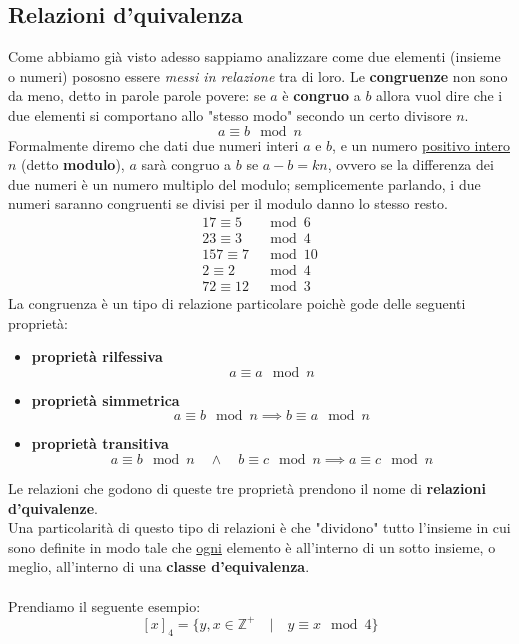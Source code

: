 \subsection{Relazioni d'quivalenza}
Come abbiamo già visto adesso sappiamo analizzare come due elementi
(insieme o numeri) pososno essere \emph{messi in relazione} tra di loro.
Le \textbf{congruenze} non sono da meno, detto in parole parole povere: 
se \(a\) è \textbf{congruo} a \(b\) allora vuol dire che i due elementi 
si comportano allo "stesso modo" secondo un certo divisore \(n\).
\[ a \equiv b \mod n\]
Formalmente diremo che dati due numeri interi \(a\) e \(b\), e un numero
\underline{positivo intero} \(n\) (detto \textbf{modulo}), \(a\) sarà 
congruo a \(b\) se \(a - b = kn\), ovvero se la differenza dei due numeri
è un numero multiplo del modulo; semplicemente parlando, i due numeri 
saranno congruenti se divisi per il modulo danno lo stesso resto.
\begin{align*}
  17 \equiv 5 &\mod 6 \\
  23 \equiv 3 &\mod 4 \\
  157 \equiv 7 &\mod 10 \\
  2 \equiv 2 &\mod 4 \\
  72 \equiv 12 &\mod 3
\end{align*}
La congruenza è un tipo di relazione particolare poichè gode delle seguenti 
proprietà:
\begin{itemize}
  \item \textbf{proprietà rilfessiva} \\
  \[ a \equiv a \mod n  \]
  \item \textbf{proprietà simmetrica} \\
  \[ a \equiv b \mod n \implies b \equiv a \mod n \]
  \item \textbf{proprietà transitiva} \\
  \[ a \equiv b \mod n \quad \land \quad b \equiv c \mod n \implies a \equiv c \mod n\]
\end{itemize}
Le relazioni che godono di queste tre proprietà prendono il nome di 
\textbf{relazioni d'quivalenze}. \\
Una particolarità di questo tipo di relazioni è che "dividono" tutto l'insieme
in cui sono definite in modo tale che \underline{ogni} elemento è all'interno
di un sotto insieme, o meglio, all'interno di una \textbf{classe d'equivalenza}.
\\
\\
Prendiamo il seguente esempio:
\[ [x]_4 = \{ y,x \in \mathbb{Z}^+ \quad | \quad y \equiv x \mod 4 \}\]
